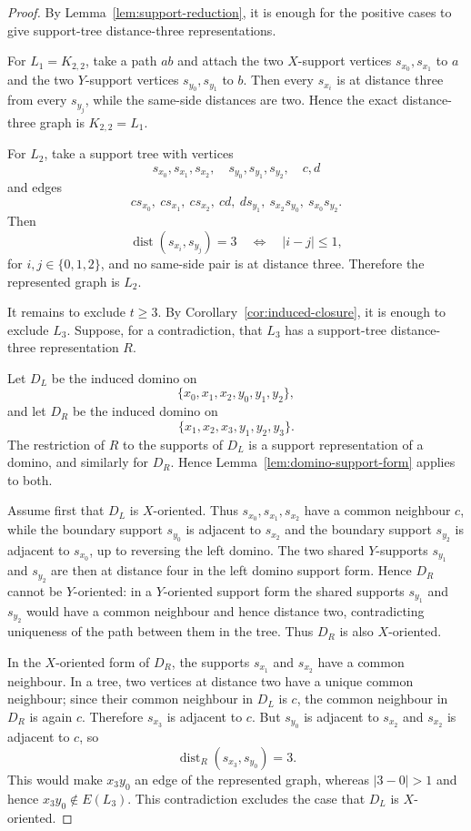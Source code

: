 \documentclass[10pt,a4paper]{amsart}
\newcommand{\dist}{\operatorname{dist}}
\begin{document}
\begin{proof}
By Lemma~\ref{lem:support-reduction}, it is enough for the positive cases to give support-tree distance-three representations.

For $L_1=K_{2,2}$, take a path $a b$ and attach the two $X$-support vertices $s_{x_0},s_{x_1}$ to $a$ and the two $Y$-support vertices $s_{y_0},s_{y_1}$ to $b$.  Then every $s_{x_i}$ is at distance three from every $s_{y_j}$, while the same-side distances are two.  Hence the exact distance-three graph is $K_{2,2}=L_1$.

For $L_2$, take a support tree with vertices
\[
 s_{x_0},s_{x_1},s_{x_2},\quad s_{y_0},s_{y_1},s_{y_2},\quad c,d
\]
and edges
\[
 cs_{x_0},\ cs_{x_1},\ cs_{x_2},\ cd,\ ds_{y_1},\ s_{x_2}s_{y_0},\ s_{x_0}s_{y_2}.
\]
Then
\[
 \dist(s_{x_i},s_{y_j})=3
 \quad\Longleftrightarrow\quad |i-j|\le1,
\]
for $i,j\in\{0,1,2\}$, and no same-side pair is at distance three.  Therefore the represented graph is $L_2$.

It remains to exclude $t\ge3$.  By Corollary~\ref{cor:induced-closure}, it is enough to exclude $L_3$.  Suppose, for a contradiction, that $L_3$ has a support-tree distance-three representation $R$.

Let $D_L$ be the induced domino on
\[
 \{x_0,x_1,x_2,y_0,y_1,y_2\},
\]
and let $D_R$ be the induced domino on
\[
 \{x_1,x_2,x_3,y_1,y_2,y_3\}.
\]
The restriction of $R$ to the supports of $D_L$ is a support representation of a domino, and similarly for $D_R$.  Hence Lemma~\ref{lem:domino-support-form} applies to both.

Assume first that $D_L$ is $X$-oriented.  Thus $s_{x_0},s_{x_1},s_{x_2}$ have a common neighbour $c$, while the boundary support $s_{y_0}$ is adjacent to $s_{x_2}$ and the boundary support $s_{y_2}$ is adjacent to $s_{x_0}$, up to reversing the left domino.  The two shared $Y$-supports $s_{y_1}$ and $s_{y_2}$ are then at distance four in the left domino support form.  Hence $D_R$ cannot be $Y$-oriented: in a $Y$-oriented support form the shared supports $s_{y_1}$ and $s_{y_2}$ would have a common neighbour and hence distance two, contradicting uniqueness of the path between them in the tree.  Thus $D_R$ is also $X$-oriented.

In the $X$-oriented form of $D_R$, the supports $s_{x_1}$ and $s_{x_2}$ have a common neighbour.  In a tree, two vertices at distance two have a unique common neighbour; since their common neighbour in $D_L$ is $c$, the common neighbour in $D_R$ is again $c$.  Therefore $s_{x_3}$ is adjacent to $c$.  But $s_{y_0}$ is adjacent to $s_{x_2}$ and $s_{x_2}$ is adjacent to $c$, so
\[
 \dist_R(s_{x_3},s_{y_0})=3.
\]
This would make $x_3y_0$ an edge of the represented graph, whereas $|3-0|>1$ and hence $x_3y_0\notin E(L_3)$.  This contradiction excludes the case that $D_L$ is $X$-oriented.


\end{proof}
\end{document}
